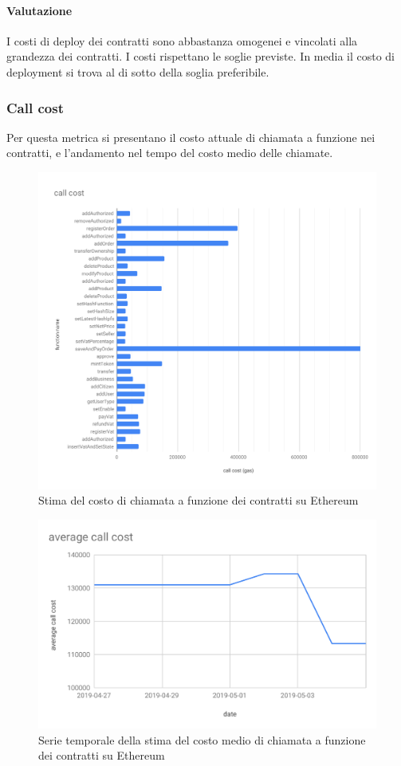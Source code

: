 \paragraph*{Valutazione}
I costi di deploy dei contratti sono abbastanza omogenei e vincolati alla grandezza dei contratti. I costi rispettano le soglie previste. In media il costo di deployment si trova al di sotto della soglia preferibile.

\subsubsection{Call cost}
Per questa metrica si presentano il costo attuale di chiamata a funzione nei contratti, e l'andamento nel tempo del costo medio delle chiamate.
\begin{figure}[H]
	\centering
	\includegraphics[scale=0.4]{res/images/RA/call-cost.pdf}
	\caption{Stima del costo di chiamata a funzione dei contratti su Ethereum}
\end{figure}
\begin{figure}[H]
	\centering
	\includegraphics[scale=0.6]{res/images/RA/average-call-cost.pdf}
	\caption{Serie temporale della stima del costo medio di chiamata a funzione dei contratti su Ethereum}
\end{figure}
